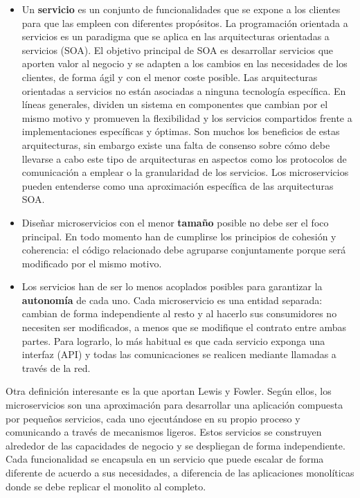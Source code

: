 \documentclass[11pt,spanish,listoffigures]{tfgetsinf}
\begin{document}
\begin{itemize}

\item Un \textbf{servicio} es un conjunto de funcionalidades que se expone a los clientes para que las empleen con diferentes propósitos. \cite{Wikipedia} La programación orientada a servicios es un paradigma que se aplica en las arquitecturas orientadas a servicios (SOA). El objetivo principal de SOA es desarrollar servicios que aporten valor al negocio y se adapten a los cambios en las necesidades de los clientes, de forma ágil y con el menor coste posible. Las arquitecturas orientadas a servicios no están asociadas a ninguna tecnología específica. En líneas generales, dividen un sistema en componentes que cambian por el mismo motivo y promueven la flexibilidad y los servicios compartidos frente a implementaciones específicas y óptimas. Son muchos los beneficios de estas arquitecturas, sin embargo existe una falta de consenso sobre cómo debe llevarse a cabo este tipo de arquitecturas en aspectos como los protocolos de comunicación a emplear o la granularidad de los servicios. \cite{Arsanjani2009a} Los microservicios pueden entenderse como una aproximación específica de las arquitecturas SOA.

\item Diseñar microservicios con el menor \textbf{tamaño} posible no debe ser el foco principal. En todo momento han de cumplirse los principios de cohesión y coherencia: el código relacionado debe agruparse conjuntamente porque será modificado por el mismo motivo.

\item  Los servicios han de ser lo menos acoplados posibles para garantizar la \textbf{autonomía} de cada uno. Cada microservicio es una entidad separada: cambian de forma independiente al resto y al hacerlo sus consumidores no necesiten ser modificados, a menos que se modifique el contrato entre ambas partes. Para lograrlo, lo más habitual es que cada servicio exponga una interfaz (API) y todas las comunicaciones se realicen mediante llamadas a través de la red.

\end{itemize}

Otra definición interesante es la que aportan Lewis y Fowler. Según ellos, los microservicios son una aproximación para desarrollar una aplicación compuesta por pequeños servicios, cada uno ejecutándose en su propio proceso y comunicando a través de mecanismos ligeros. Estos servicios se construyen alrededor de las capacidades de negocio y se despliegan de forma independiente. \cite{Lewis2014} Cada funcionalidad se encapsula en un servicio que puede escalar de forma diferente de acuerdo a sus necesidades, a diferencia de las aplicaciones monolíticas donde se debe replicar el monolito al completo.
\end{document}
